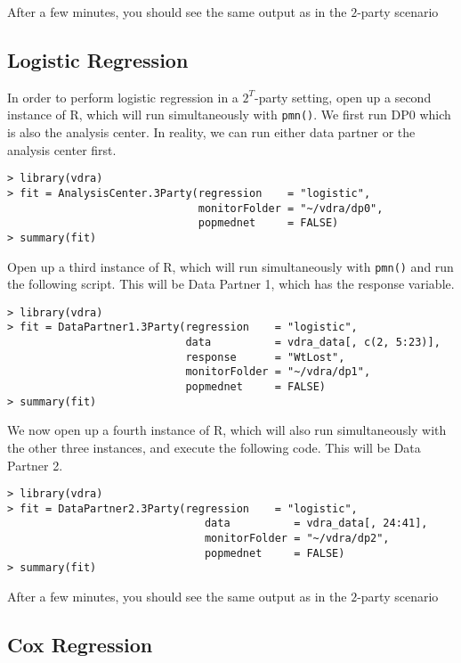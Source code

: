 \documentclass[12]{article}
\begin{document}
After a few minutes, you should see the same output as in the $2$-party scenario

\subsection{Logistic Regression}

In order to perform logistic regression in a $2^T$-party setting, open up a second instance of R, which will run simultaneously with \verb"pmn()".  We first run DP0 which is also the analysis center.  In reality, we can run either data partner or the analysis center first.

\begin{verbatim}
> library(vdra)
> fit = AnalysisCenter.3Party(regression    = "logistic",
                              monitorFolder = "~/vdra/dp0",
                              popmednet     = FALSE)
> summary(fit)
\end{verbatim}

Open up a third instance of R, which will run simultaneously with \verb"pmn()" and run the following script.  This will be Data Partner 1, which has the response variable.

\begin{verbatim}
> library(vdra)
> fit = DataPartner1.3Party(regression    = "logistic",
                            data          = vdra_data[, c(2, 5:23)],
                            response      = "WtLost",
                            monitorFolder = "~/vdra/dp1",
                            popmednet     = FALSE)
> summary(fit)
\end{verbatim}

We now open up a fourth instance of R, which will also run simultaneously with the other three instances, and execute the following code.  This will be Data Partner 2.

\begin{verbatim}
> library(vdra)
> fit = DataPartner2.3Party(regression    = "logistic",
                               data          = vdra_data[, 24:41],
                               monitorFolder = "~/vdra/dp2",
                               popmednet     = FALSE)
> summary(fit)
\end{verbatim}

After a few minutes, you should see the same output as in the $2$-party scenario

\subsection{Cox Regression}
\end{document}
